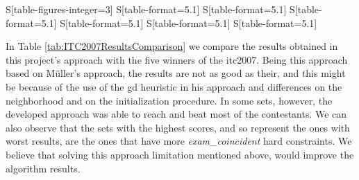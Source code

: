 \begin{table*}[!t]
\begin{tabular}{%
	S[table-figures-integer=3]%
	S[table-format=5.1]%
	S[table-format=5.1]%
	S[table-format=5.1]%
	S[table-format=5.1]%
	S[table-format=5.1]%
	S[table-format=5.1]%
    }
\bottomrule

\end{tabular}
\label{tab:20tests}
\end{table*}In Table \ref{tab:ITC2007ResultsComparison} we compare the results obtained in this project's approach with the five winners of the \gls{itc2007}. Being this approach based on M\"{u}ller's \cite{Mueller2009} approach, the results are not as good as their, and this might be because of the use of the \gls{gd} heuristic in his approach and differences on the neighborhood and on the initialization procedure. In some sets, however, the developed approach was able to reach and beat most of the contestants. We can also observe that the sets with the highest scores, and so represent the ones with worst results, are the ones that have more \textit{exam\_coincident} hard constraints. We believe that solving this approach limitation mentioned above, would improve the algorithm results.\\
\\
